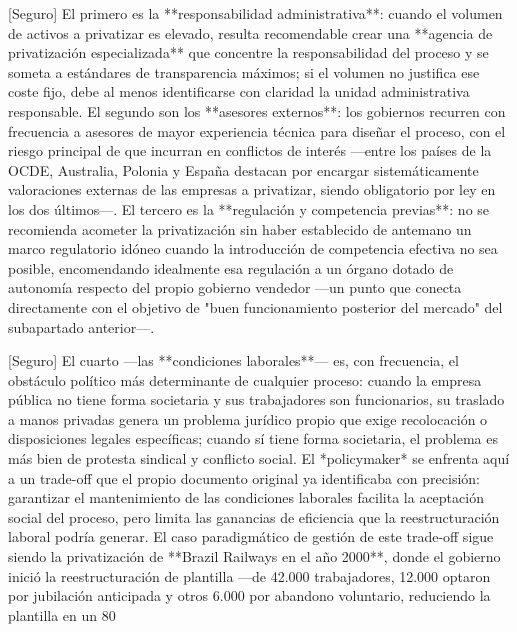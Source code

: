 \documentclass[10pt,a4paper]{article}
\begin{document}
[Seguro] El primero es la **responsabilidad administrativa**: cuando el volumen de activos a privatizar es elevado, resulta recomendable crear una **agencia de privatización especializada** que concentre la responsabilidad del proceso y se someta a estándares de transparencia máximos; si el volumen no justifica ese coste fijo, debe al menos identificarse con claridad la unidad administrativa responsable. El segundo son los **asesores externos**: los gobiernos recurren con frecuencia a asesores de mayor experiencia técnica para diseñar el proceso, con el riesgo principal de que incurran en conflictos de interés —entre los países de la OCDE, Australia, Polonia y España destacan por encargar sistemáticamente valoraciones externas de las empresas a privatizar, siendo obligatorio por ley en los dos últimos—. El tercero es la **regulación y competencia previas**: no se recomienda acometer la privatización sin haber establecido de antemano un marco regulatorio idóneo cuando la introducción de competencia efectiva no sea posible, encomendando idealmente esa regulación a un órgano dotado de autonomía respecto del propio gobierno vendedor —un punto que conecta directamente con el objetivo de "buen funcionamiento posterior del mercado" del subapartado anterior—.

[Seguro] El cuarto —las **condiciones laborales**— es, con frecuencia, el obstáculo político más determinante de cualquier proceso: cuando la empresa pública no tiene forma societaria y sus trabajadores son funcionarios, su traslado a manos privadas genera un problema jurídico propio que exige recolocación o disposiciones legales específicas; cuando sí tiene forma societaria, el problema es más bien de protesta sindical y conflicto social. El *policymaker* se enfrenta aquí a un trade-off que el propio documento original ya identificaba con precisión: garantizar el mantenimiento de las condiciones laborales facilita la aceptación social del proceso, pero limita las ganancias de eficiencia que la reestructuración laboral podría generar. El caso paradigmático de gestión de este trade-off sigue siendo la privatización de **Brazil Railways en el año 2000**, donde el gobierno inició la reestructuración de plantilla —de 42.000 trabajadores, 12.000 optaron por jubilación anticipada y otros 6.000 por abandono voluntario, reduciendo la plantilla en un 80%
\end{document}
